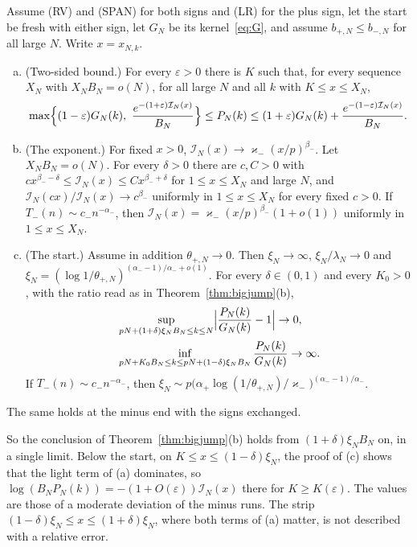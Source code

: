 \begin{theorem}\label{thm:window}
Assume (RV) and (SPAN) for both signs and (LR) for the plus sign, let the start be fresh
with either sign, let $G_N$ be its kernel~\eqref{eq:G}, and assume
$b_{\plus,N}\le b_{\minus,N}$ for all large $N$. Write $x=x_{N,k}$.
\begin{enumerate}[(a)]
\item (Two-sided bound.) For every $\varepsilon>0$ there is $K$ such that, for every
sequence $X_N$ with $X_NB_N=o(N)$, for all large $N$ and all $k$ with $K\le x\le X_N$,
\[
 \max\Bigl\{(1-\varepsilon)G_N(k),\ \frac{e^{-(1+\varepsilon)\mathcal I_N(x)}}{B_N}\Bigr\}
 \le P_N(k)\le(1+\varepsilon)G_N(k)+\frac{e^{-(1-\varepsilon)\mathcal I_N(x)}}{B_N} .
\]
\item (The exponent.) For fixed $x>0$, $\mathcal I_N(x)\to\varkappa_\minus(x/p)^{\beta_\minus}$.
Let $X_NB_N=o(N)$. For every $\delta>0$ there are $c,C>0$ with
$cx^{\beta_\minus-\delta}\le\mathcal I_N(x)\le Cx^{\beta_\minus+\delta}$ for $1\le x\le X_N$
and large $N$, and $\mathcal I_N(cx)/\mathcal I_N(x)\to c^{\beta_\minus}$ uniformly in
$1\le x\le X_N$ for every fixed $c>0$. If $T_\minus(n)\sim c_\minus n^{-\alpha_\minus}$,
then $\mathcal I_N(x)=\varkappa_\minus(x/p)^{\beta_\minus}(1+o(1))$ uniformly in
$1\le x\le X_N$.
\item (The start.) Assume in addition $\theta_{\plus,N}\to0$. Then $\xi_N\to\infty$,
$\xi_N/\lambda_N\to0$ and
$\xi_N=(\log1/\theta_{\plus,N})^{(\alpha_\minus-1)/\alpha_\minus+o(1)}$. For every
$\delta\in(0,1)$ and every $K_0>0$, with the ratio read as in Theorem~\ref{thm:bigjump}(b),
\begin{align*}
 &\sup_{pN+(1+\delta)\xi_NB_N\le k\le N}\Bigl|\frac{P_N(k)}{G_N(k)}-1\Bigr|\to0,\\
 &\inf_{pN+K_0B_N\le k\le pN+(1-\delta)\xi_NB_N}\frac{P_N(k)}{G_N(k)}\to\infty .
\end{align*}
If $T_\minus(n)\sim c_\minus n^{-\alpha_\minus}$, then
$\xi_N\sim p\bigl(\alpha_\plus\log(1/\theta_{\plus,N})/\varkappa_\minus\bigr)^{(\alpha_\minus-1)/\alpha_\minus}$.
\end{enumerate}
The same holds at the minus end with the signs exchanged.
\end{theorem}

So the conclusion of Theorem~\ref{thm:bigjump}(b) holds from $(1+\delta)\xi_NB_N$ on, in
a single limit. Below the start, on $K\le x\le(1-\delta)\xi_N$, the proof of (c) shows that
the light term of (a) dominates, so $\log(B_NP_N(k))=-(1+O(\varepsilon))\mathcal I_N(x)$
there for $K\ge K(\varepsilon)$. The values are those of a
moderate deviation of the minus runs. The strip $(1-\delta)\xi_N\le x\le(1+\delta)\xi_N$,
where both terms of (a) matter, is not described with a relative error.

